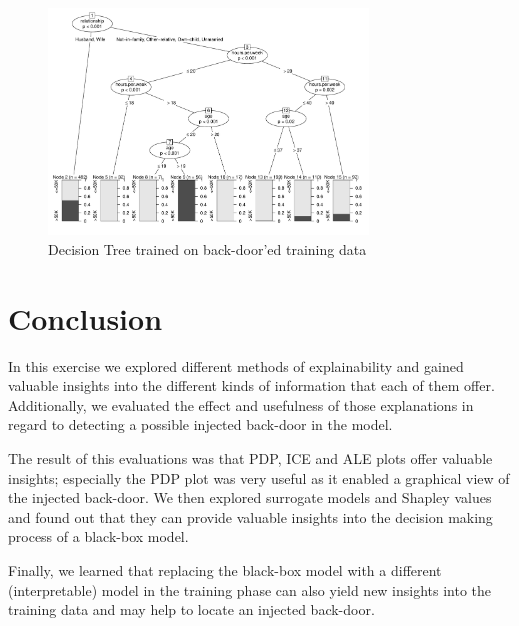 \documentclass[sigconf,nonacm]{acmart}
\begin{document}
\begin{figure}
    \includegraphics[width=8.5cm]{decisionTreeDirty.pdf}
    \caption{Decision Tree trained on back-door'ed training data}
    \label{fig:dtree:dirty}
\end{figure}

\hypertarget{conclusion}{%
\section{Conclusion}\label{conclusion}}

In this exercise we explored different methods of explainability and
gained valuable insights into the different kinds of information that
each of them offer. Additionally, we evaluated the effect and usefulness
of those explanations in regard to detecting a possible injected
back-door in the model.

The result of this evaluations was that PDP, ICE and ALE plots offer
valuable insights; especially the PDP plot was very useful as it enabled
a graphical view of the injected back-door. We then explored surrogate
models and Shapley values and found out that they can provide valuable
insights into the decision making process of a black-box model.

Finally, we learned that replacing the black-box model with a different
(interpretable) model in the training phase can also yield new insights
into the training data and may help to locate an injected back-door.



\end{document}
